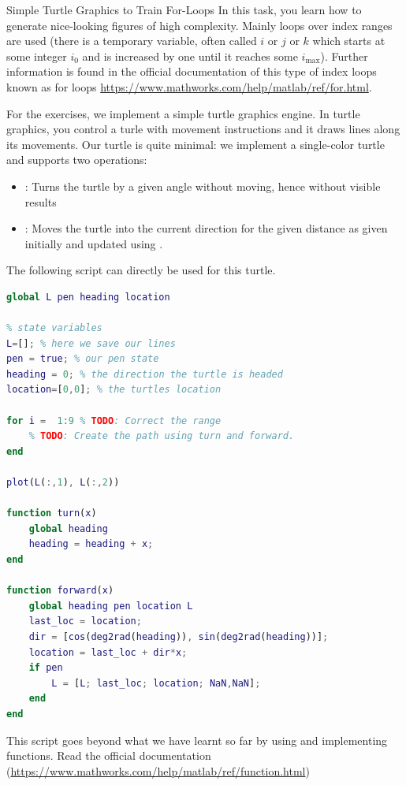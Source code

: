 \begin{task}{Simple Turtle Graphics to Train For-Loops}{}{}
  In this task, you learn how to generate nice-looking figures of high complexity. Mainly loops over index ranges are used (there is a temporary variable, often called $i$ or $j$ or $k$ which starts at some integer $i_0$ and is increased by one until it reaches some $i_{\max}$).
  Further information is found in the official documentation of this type of index loops known as for loops \url{https://www.mathworks.com/help/matlab/ref/for.html}.

  For the exercises, we implement a simple turtle graphics engine. In turtle graphics, you control a turle with movement instructions and it draws lines along its movements. Our turtle is quite minimal: we implement a single-color turtle and supports two operations:
  \begin{itemize}
  \item {: Turns the turtle by a given angle without moving, hence without visible results}
  \item{: Moves the turtle into the current direction for the given distance as given initially and updated using .}
  \end{itemize}

  The following script can directly be used for this turtle.
  \begin{lstlisting}[language=matlab, caption='Simple Turtle']
% A simple Turtle
global L pen heading location

% state variables
L=[]; % here we save our lines
pen = true; % our pen state
heading = 0; % the direction the turtle is headed
location=[0,0]; % the turtles location

for i =  1:9 % TODO: Correct the range
    % TODO: Create the path using turn and forward.
end

plot(L(:,1), L(:,2))

function turn(x)
    global heading
    heading = heading + x;
end

function forward(x)
    global heading pen location L
    last_loc = location;
    dir = [cos(deg2rad(heading)), sin(deg2rad(heading))];
    location = last_loc + dir*x;
    if pen
        L = [L; last_loc; location; NaN,NaN];
    end
end

    \end{lstlisting}

  This script goes beyond what we have learnt so far by using and implementing functions. Read the official documentation (\url{https://www.mathworks.com/help/matlab/ref/function.html})


\end{task}
